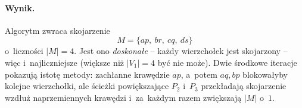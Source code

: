 \paragraph{Wynik.}
Algorytm zwraca skojarzenie
\[
	\boxed{M = \{ap,\ br,\ cq,\ ds\}}
\]
o~liczności $|M| = 4$. Jest ono \emph{doskonałe} -- każdy wierzchołek jest
skojarzony -- więc i~najliczniejsze (większe niż $|V_1| = 4$ być nie może).
Dwie środkowe iteracje pokazują istotę metody: zachłanne krawędzie $ap$, a~potem
$aq, bp$ blokowałyby kolejne wierzchołki, ale ścieżki powiększające $P_2$ i~$P_3$
przekładają skojarzenie wzdłuż naprzemiennych krawędzi i~za~każdym razem
zwiększają $|M|$ o~$1$.
